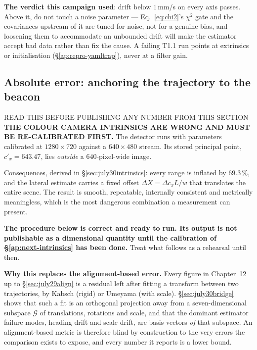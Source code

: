 \noindent \textbf{The verdict this campaign used}: drift below
$1$\,mm/s on every axis passes. Above it, do not touch a noise parameter ---
Eq.~\eqref{eq:chi2}'s $\chi^2$ gate and the covariances upstream of it are
tuned for noise, not for a genuine bias, and loosening them to accommodate an
unbounded drift will make the estimator accept bad data rather than fix the
cause. A failing T1.1 run points at extrinsics or initialisation
(\S\ref{ap:repro-yamltrap}), never at a filter gain.

\subsection{Absolute error: anchoring the trajectory to the beacon}
\label{ap:repro-absolute}

\begin{trapbox}{READ THIS BEFORE PUBLISHING ANY NUMBER FROM THIS SECTION}
\textbf{THE COLOUR CAMERA INTRINSICS ARE WRONG AND MUST BE RE-CALIBRATED
FIRST.} The detector runs with parameters calibrated at $1280\times720$
against a $640\times480$ stream. Its stored principal point,
$c'_x = 643.47$, lies \emph{outside} a $640$-pixel-wide image.

Consequences, derived in \S\ref{sec:july30intrinsics}: every range is
inflated by $69.3\,\%$, and the lateral estimate carries a fixed offset
$\Delta X = \Delta c_x L / w$ that translates the entire scene. The result is
smooth, repeatable, internally consistent and metrically meaningless, which is
the most dangerous combination a measurement can present.

\textbf{The procedure below is correct and ready to run. Its output is not
publishable as a dimensional quantity until the calibration of
\S\ref{ap:next-intrinsics} has been done.} Treat what follows as a rehearsal
until then.
\end{trapbox}

\noindent\textbf{Why this replaces the alignment-based error.} Every figure in
Chapter~12 up to \S\ref{sec:july29align} is a residual left after fitting a
transform between two trajectories, by Kabsch (rigid) or Umeyama (with scale).
\S\ref{sec:july30bridge} shows that such a fit is an orthogonal projection
away from a seven-dimensional subspace $\mathcal{G}$ of translations,
rotations and scale, and that the dominant estimator failure modes, heading
drift and scale drift, are basis vectors \emph{of} that subspace. An
alignment-based metric is therefore blind by construction to the very errors
the comparison exists to expose, and every number it reports is a lower bound.


